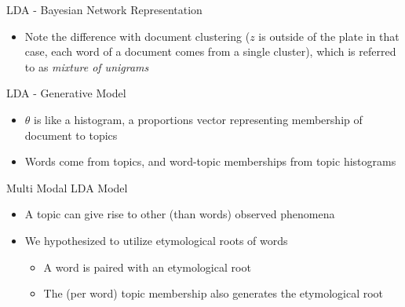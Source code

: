 \documentclass[pdf]{beamer}
\begin{document}
\begin{frame}{LDA - Bayesian Network Representation}
	\hspace{5cm}
	\begin{itemize}
		\item Note the difference with document clustering ($z$ is outside of the plate in that case, each word of a document comes from a single cluster), which is referred to as \textit{mixture of unigrams}
	\end{itemize}
\end{frame}

\begin{frame}{LDA - Generative Model}
	\begin{itemize}
		\item $\theta$ is like a histogram, a proportions vector representing membership of document to topics
		\item Words come from topics, and word-topic memberships from topic histograms
	\end{itemize}
\end{frame}


\begin{frame}{Multi Modal LDA Model}
	\begin{itemize}
		\item A topic can give rise to other (than words) observed phenomena
		\item We hypothesized to utilize etymological roots of words
		\begin{itemize}
			\item A word is paired with an etymological root
			\item The (per word) topic membership also generates the etymological root
		\end{itemize}
	\end{itemize}
\end{frame}
\end{document}
